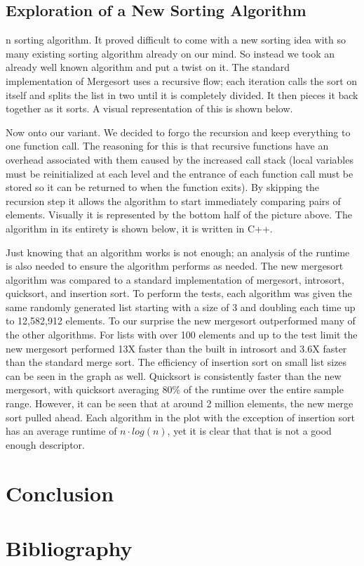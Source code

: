 \documentclass[12pt]{article}
\begin{document}
	\subsection{Exploration of a New Sorting Algorithm}
	
	n sorting algorithm. It proved difficult to come with a new sorting idea with so many existing sorting algorithm already on our mind.
	So instead we took an already well known algorithm and put a twist on it. 
	The standard implementation of Mergesort uses a recursive flow; each iteration calls the sort on itself and splits the list in two until it is completely divided. 
	It then pieces it back together as it sorts. 
	A visual representation of this is shown below.

	
	Now onto our variant. 
	We decided to forgo the recursion and keep everything to one function call. 
	The reasoning for this is that recursive functions have an overhead associated with them caused by the increased call stack (local variables must be reinitialized at each level and the entrance of each function call must be stored so it can be returned to when the function exits). 
	By skipping the recursion step it allows the algorithm to start immediately comparing pairs of elements. 
	Visually it is represented by the bottom half of the picture above. 
	The algorithm in its entirety is shown below, it is written in C++.
	
		

	Just knowing that an algorithm works is not enough; an analysis of the runtime is also needed to ensure the algorithm performs as needed. 
	The new mergesort algorithm was compared to a standard implementation of mergesort, introsort, quicksort, and insertion sort. 
	To perform the tests, each algorithm was given the same randomly generated list starting with a size of 3 and doubling each time up to 12,582,912 elements. 
	To our surprise the new mergesort outperformed many of the other algorithms. 
	For lists with over 100 elements and up to the test limit the new mergesort performed 13X faster than the built in introsort and 3.6X faster than the standard merge sort. 
	The efficiency of insertion sort on small list sizes can be seen in the graph as well. Quicksort is consistently faster than the new mergesort, with quicksort averaging 80\% of the runtime over the entire sample range. 
	However, it can be seen that at around 2 million elements, the new merge sort pulled ahead. 
	Each algorithm in the plot with the exception of insertion sort has an average runtime of $ n \cdot log (n) $, yet it is clear that that is not a good enough descriptor.




\section{Conclusion}



\section{Bibliography}%
\end{document}
